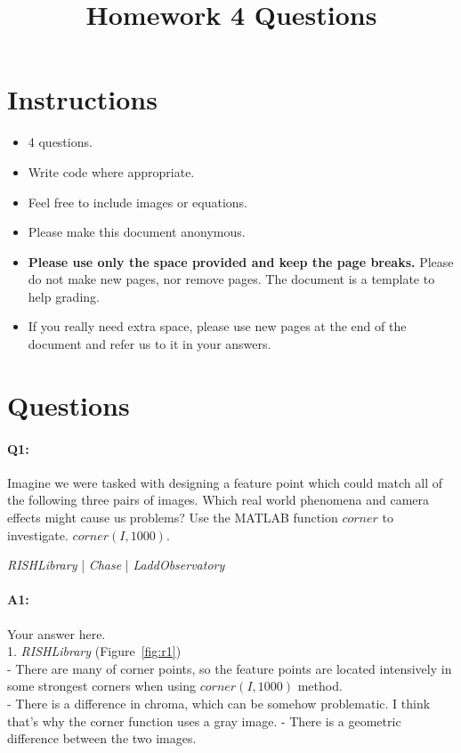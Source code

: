 \title{\vspace{-1cm}Homework 4 Questions}



\maketitle
\vspace{-3cm}
\thispagestyle{fancy}

\section*{Instructions}
\begin{itemize}
  \item 4 questions.
  \item Write code where appropriate.
  \item Feel free to include images or equations.
  \item Please make this document anonymous.
  \item \textbf{Please use only the space provided and keep the page breaks.} Please do not make new pages, nor remove pages. The document is a template to help grading.
  \item If you really need extra space, please use new pages at the end of the document and refer us to it in your answers.
\end{itemize}

\section*{Questions}

\paragraph{Q1:} Imagine we were tasked with designing a feature point which could match all of the following three pairs of images. Which real world phenomena and camera effects might cause us problems?
Use the MATLAB function \href{https://www.mathworks.com/help/images/ref/corner.html}{$corner$} to investigate. $corner(I,1000)$.

\emph{RISHLibrary} | \emph{Chase} | \emph{LaddObservatory}

\paragraph{A1:} Your answer here.
\\
1. \emph{RISHLibrary} (Figure~\ref{fig:r1})\\
- There are many of corner points, so the feature points are located intensively in some strongest corners when using $corner(I,1000)$ method.\\
- There is a difference in chroma, which can be somehow problematic. I think that's why the corner function uses a gray image.
- There is a geometric difference between the two images.


